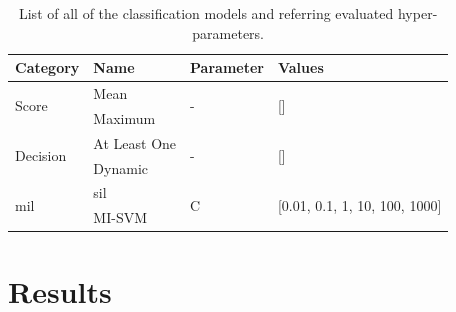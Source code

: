 \documentclass[journal,article,submit,moreauthors,pdftex, applsci]{Definitions/mdpi}
\begin{document}
\begin{table}[H]
    \centering
    \begin{tabular}{llll}
    \textbf{Category}               & \textbf{Name}     & \textbf{Parameter}& \textbf{Values}                                   \\ \hline
    \multirow{2}{*}{Score}          & Mean              & \multirow{2}{*}{-}& \multirow{2}{*}{[]}                               \\ \cline{2-2}
                                    & Maximum           &                   &                                                   \\ \hline 
    \multirow{2}{*}{Decision}       & At Least One      & \multirow{2}{*}{-}& \multirow{2}{*}{[]}                               \\ \cline{2-2}
                                    & Dynamic           &                   &                                                   \\ \hline 
    \multirow{2}{*}{\ac{mil}}       & \ac{sil}          & \multirow{2}{*}{C}& \multirow{2}{*}{[0.01, 0.1, 1, 10, 100, 1000]}    \\ \cline{2-2}
                                    & MI-SVM            &                   &                                                   \\ \hline 
    \end{tabular}    
    \caption{List of all of the classification models and referring evaluated hyper-parameters.}
    \label{tab:patient_hyperparameters}
\end{table}\par

\section{Results}
\label{sec:results}
\end{document}
